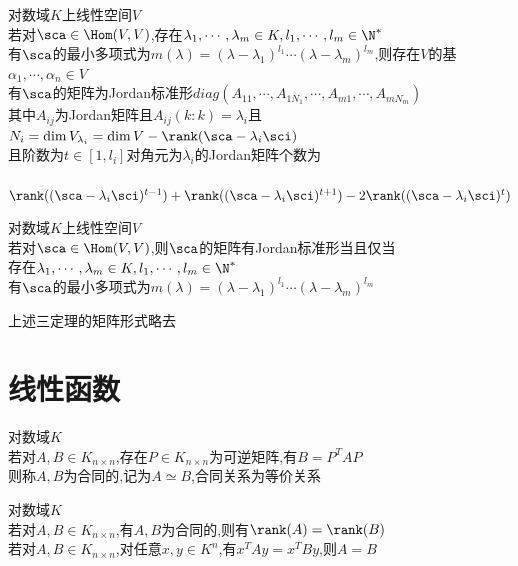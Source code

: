 \begin{dingli}
对数域$K$上线性空间$V$\\
若对$\sca\in \Hom(V,V)$,存在$\lambda_1,\cdots,\lambda_m\in K,l_1,\cdots,l_m\in\N^*$\\
有$\sca$的最小多项式为$m(\lambda)=(\lambda-\lambda_1)^{l_1}\cdots(\lambda-\lambda_m)^{l_m}$,则存在$V$的基$\alpha_1,\cdots,\alpha_n\in V$\\
有$\sca$的矩阵为Jordan标准形$diag(A_{11},\cdots,A_{1N_1},\cdots,A_{m1},\cdots,A_{mN_m})$\\
其中$A_{ij}$为Jordan矩阵且$A_{ij}(k:k)=\lambda_i$且$N_i=\dim V_{\lambda_i}=\dim V-\rank(\sca-\lambda_i\sci)$\\
且阶数为$t\in[1,l_i]$对角元为$\lambda_i$的Jordan矩阵个数为\\
\ \ $\rank((\sca-\lambda_i\sci)^{t-1})+\rank((\sca-\lambda_i\sci)^{t+1})-2\rank((\sca-\lambda_i\sci)^{t})$
\end{dingli}

\begin{dingli}
对数域$K$上线性空间$V$\\
若对$\sca\in \Hom(V,V)$,则$\sca$的矩阵有Jordan标准形当且仅当\\
存在$\lambda_1,\cdots,\lambda_m\in K,l_1,\cdots,l_m\in\N^*$\\
有$\sca$的最小多项式为$m(\lambda)=(\lambda-\lambda_1)^{l_1}\cdots(\lambda-\lambda_m)^{l_m}$
\end{dingli}

\begin{zhu}
上述三定理的矩阵形式略去
\end{zhu}


\chapter{线性函数}

\begin{dingyi}
对数域$K$\\
若对$A,B\in K_{n\times n}$,存在$P\in K_{n\times n}$为可逆矩阵,有$B=P^{T}AP$\\
则称$A,B$为合同的,记为$A\simeq B$,合同关系为等价关系
\end{dingyi}

\begin{dingli}
对数域$K$\\
若对$A,B\in K_{n\times n}$,有$A,B$为合同的,则有$\rank(A)=\rank(B)$\\
若对$A,B\in K_{n\times n}$,对任意$x,y\in K^n$,有$x^{T}Ay=x^{T}By$,则$A=B$
\end{dingli}

